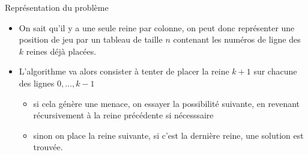 \documentclass[10pt]{beamer}
\begin{document}
\begin{frame}[fragile]{\Ctitle}{\stitle}
	\begin{exampleblock}{Représentation du problème}
		\begin{itemize}
			\item <1-> On sait qu'il y a une seule reine par colonne, on peut donc représenter une position de jeu par un tableau de taille $n$ contenant les numéros de ligne des $k$ reines déjà placées.
			\item <2-> L'algorithme va alors consister à tenter de placer la reine $k+1$ sur chacune des lignes $0, \dots, k-1$
			      \begin{itemize}
				      \item si cela génère une menace, on essayer la possibilité suivante, en revenant récursivement à la reine précédente si nécesssaire
				      \item sinon on place la reine suivante, si c'est la dernière reine, une solution est trouvée.
			      \end{itemize}
		\end{itemize}
	\end{exampleblock}
\end{frame}
\end{document}
